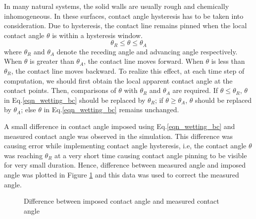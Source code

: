 \documentclass{article}
\begin{document}
In many natural systems, the solid walls are usually rough and chemically inhomogeneous. In these surfaces, contact angle hysteresis has to be taken into consideration. Due to hysteresis, the contact line remains pinned when the local contact angle $\theta$ is within a hysteresis window.
\begin{equation}
\theta_{R} \leq \theta \leq \theta_{A} 
\end{equation}
where $\theta_{R}$ and $\theta_{A}$ denote the receding angle and advancing angle respectively. 
\newline
When $\theta$ is greater than $\theta_{A}$, the contact line moves forward. When $\theta$ is less than $\theta_{R}$, the contact line moves backward. To realize this effect, at each time step of computation, we should first obtain the local apparent contact angle at the contact points. Then, comparisons of $\theta$ with $\theta_{R}$ and $\theta_{A}$ are required. If $\theta \leq \theta_{R}$, $\theta$ in Eq.\ref{eqn_wetting_bc} should be replaced by $\theta_{R}$; if $\theta \geq \theta_{A}$, $\theta$ should be replaced by $\theta_{A}$; else $\theta$ in Eq.\ref{eqn_wetting_bc} remains unchanged.
\par
A small difference in contact angle imposed using Eq.\ref{eqn_wetting_bc} and measured contact angle was observed in the simulation. This difference was causing error while implementing contact angle hysteresis, i.e, the contact angle $\theta$ was reaching $\theta_{R}$ at a very short time causing contact angle pinning to be visible for very small duration. Hence, difference between measured angle and imposed angle was plotted in Figure \ref{fig:angle_correction} and this data was used to correct the measured angle. 
\begin{figure}[h!]
	\begin{center}
		\caption{Difference between imposed contact angle and measured contact angle}
		\label{fig:angle_correction}
	\end{center}
\end{figure}
\end{document}
